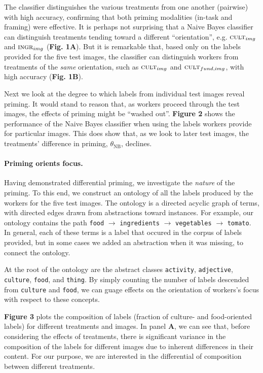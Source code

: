 \documentclass[a4paper]{report}
\begin{document}
The classifier distinguishes the various treatments from one another (pairwise)
with high accuracy, confirming that both priming modalities 
(in-task and framing) were effective.  It is perhaps not surprising that
a Naive Bayes classifier can distinguish treatments tending toward a different 
``orientation'', e.g. $\textsc{cult}_{img}$ and $\textsc{ingr}_{img}$
(\textbf{Fig. 1A}).
But it is remarkable that, based only on the labels provided for the five test 
images, the classifier can distinguish workers from treatments of the 
\textit{same} orientation, such as $\textsc{cult}_{img}$ and 
$\textsc{cult}_{fund, img}$, with high accuracy (\textbf{Fig. 1B}).

Next we look at the degree to which labels from individual test images reveal 
priming.  It would stand to reason that, as workers proceed through 
the test images, the effects of priming might be ``washed out''.  
\textbf{Figure 2} shows the
performance of the Naive Bayes classifier when using the labels workers provide
for particular images.  This does show that, as we look to later test images, 
the treatments' difference in priming, $\theta_\text{NB}$, declines.  

\paragraph{Priming orients focus.} Having demonstrated differential 
priming, we investigate the \textit{nature} of the priming.  To this
end, we construct an ontology of all the labels produced by the workers
for the five test images.  The ontology is a directed acyclic graph of terms,
with directed edges drawn from abstractions toward instances.  For example,
our ontology contains the path \texttt{food} $\to$ \texttt{ingredients} $\to$ 
\texttt{vegetables} 
$\to$ \texttt{tomato}.  In general, each of these terms is a label that
occured in the corpus of labels provided, but in some cases we added 
an abstraction when it was missing, to connect the ontology.

At the root of the ontology are the abstract classes \texttt{activity}, 
\texttt{adjective}, \texttt{culture}, \texttt{food}, and \texttt{thing}.
By simply counting the number of labels descended from \texttt{culture}
and \texttt{food}, we can guage effects on the orientation of workers's focus
with respect to these concepts.

\textbf{Figure 3} plots the composition of labels (fraction of culture- and 
food-oriented labels) for different treatments and images.  In 
panel \textbf{A}, we can see that, before considering the effects of 
treatments, there is significant variance in the composition of the labels 
for different images due to inherent differences in their content.  For our 
purpose, we are interested in the differential of composition between 
different treatments.
\end{document}
